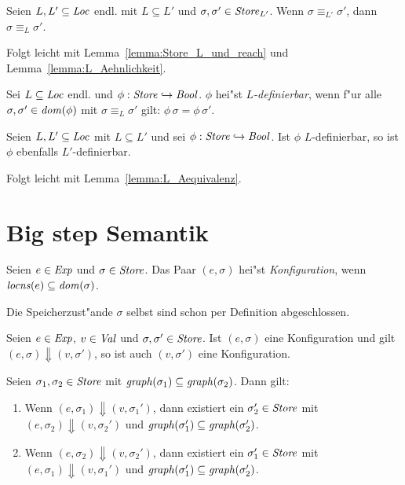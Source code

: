 \documentclass[12pt,a4paper,bigheadings]{scrartcl}
\newcommand{\locns}{\name{locns}}
\newcommand{\grph}[1]{\name{graph}(#1)}
\begin{document}
\begin{lemma} \label{lemma:L_Aequivalenz}
  Seien $L,L'\subseteq{\text{\it Loc\/}}$ endl. mit $L \subseteq L'$ und $\sigma,\sigma'\in{\text{\it Store\/}}_{L'}$. Wenn $\sigma \equiv_{L'} \sigma'$,
  dann $\sigma \equiv_L \sigma'$.
\end{lemma}

\begin{beweis}
  Folgt leicht mit Lemma~\ref{lemma:Store_L_und_reach} und Lemma~\ref{lemma:L_Aehnlichkeit}.
\end{beweis}

\begin{definition}[$L$-Definierbarkeit]
  Sei $L \subseteq {\text{\it Loc\/}}$ endl. und $\phi:{\text{\it Store\/}}\hookrightarrow{\text{\it Bool\/}}$.
  $\phi$ hei"st {\em $L$-definierbar}, wenn f"ur alle $\sigma,\sigma'\in{\text{\it dom\/}}(\phi)$ mit
  $\sigma \equiv_L \sigma'$ gilt: $\phi\,\sigma = \phi\,\sigma'$.
\end{definition}

\begin{lemma} \label{lemma:L_Definierbarkeit}
  Seien $L,L'\subseteq{\text{\it Loc\/}}$ mit $L \subseteq L'$ und sei $\phi:{\text{\it Store\/}} \hookrightarrow {\text{\it Bool\/}}$. Ist $\phi$ $L$-definierbar,
  so ist $\phi$ ebenfalls $L'$-definierbar.
\end{lemma}

\begin{beweis}
  Folgt leicht mit Lemma~\ref{lemma:L_Aequivalenz}.
\end{beweis}


\section{Big step Semantik}

\begin{definition}[Konfiguration]
  Seien $e\in{\text{\it Exp\/}}$ und $\sigma\in{\text{\it Store\/}}$.
  Das Paar $(e,\sigma)$ hei"st {\em Konfiguration}, wenn $\locns(e) \subseteq \dom{\sigma}$.
\end{definition}

Die Speicherzust"ande $\sigma$ selbst sind schon per Definition abgeschlossen.

\begin{lemma}
  Seien $e\in{\text{\it Exp\/}}$, $v\in{\text{\it Val\/}}$ und $\sigma,\sigma'\in{\text{\it Store\/}}$. Ist $(e,\sigma)$ eine Konfiguration
  und gilt $(e,\sigma) \Downarrow (v,\sigma')$, so ist auch $(v,\sigma')$ eine Konfiguration.
\end{lemma}

\begin{lemma}
  Seien $\sigma_1,\sigma_2\in{\text{\it Store\/}}$ mit $\grph{\sigma_1} \subseteq \grph{\sigma_2}$. Dann gilt:
  \begin{enumerate}
    \item Wenn $(e,\sigma_1) \Downarrow (v,\sigma_1')$, dann existiert ein $\sigma_2'\in{\text{\it Store\/}}$ mit
          $(e,\sigma_2) \Downarrow (v,\sigma_2')$ und $\grph{\sigma_1'} \subseteq \grph{\sigma_2'}$.
    \item Wenn $(e,\sigma_2) \Downarrow (v,\sigma_2')$, dann existiert ein $\sigma_1'\in{\text{\it Store\/}}$ mit
          $(e,\sigma_1) \Downarrow (v,\sigma_1')$ und $\grph{\sigma_1'} \subseteq \grph{\sigma_2'}$.
  \end{enumerate}
\end{lemma}
\end{document}
